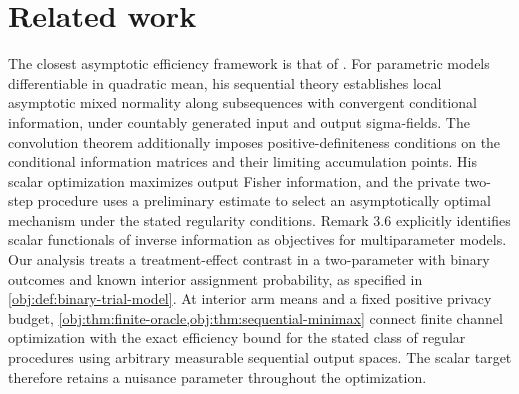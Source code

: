 \documentclass[11pt]{article}
\begin{document}
\section{Related work}

The closest asymptotic efficiency framework is that of \citet[Theorems 3.3 and 3.5, Remark 3.6, and Section 4]{Steinberger2024}. For parametric models differentiable in quadratic mean, his sequential theory establishes local asymptotic mixed normality along subsequences with convergent conditional information, under countably generated input and output sigma-fields. The convolution theorem additionally imposes positive-definiteness conditions on the conditional information matrices and their limiting accumulation points. His scalar optimization maximizes output Fisher information, and the private two-step procedure uses a preliminary estimate to select an asymptotically optimal mechanism under the stated regularity conditions. Remark 3.6 explicitly identifies scalar functionals of inverse information as objectives for multiparameter models. %
Our analysis treats a treatment-effect contrast in a two-parameter  with binary outcomes and known interior assignment probability, as specified in \cref{obj:def:binary-trial-model}. At interior arm means and a fixed positive privacy budget, \cref{obj:thm:finite-oracle,obj:thm:sequential-minimax} connect finite channel optimization with the exact efficiency bound for the stated class of regular procedures using arbitrary measurable sequential output spaces. The scalar target therefore retains a nuisance parameter throughout the optimization.
\end{document}

